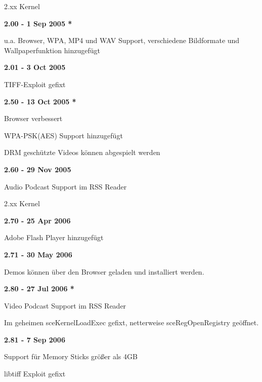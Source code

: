 \documentclass[mode=print,paper=screen,size=10pt,style=paintings]{powerdot}
\begin{document}
\begin{slide}{2.xx Kernel}
	\begin{large}\textbf{2.00 - 1 Sep 2005 *}\end{large}
	\begin{list}{-}{}
		\item{u.a. Browser, WPA, MP4 und WAV Support, verschiedene Bildformate und Wallpaperfunktion hinzugefügt}
	\end{list}
	\begin{large}\textbf{2.01 - 3 Oct 2005}\end{large}
	\begin{list}{-}{}
		\item{TIFF-Exploit gefixt}
	\end{list}
	\begin{large}\textbf{2.50 - 13 Oct 2005 *}\end{large}
	\begin{list}{-}{}
		\item{Browser verbessert}
		\item{WPA-PSK(AES) Support hinzugefügt}
		\item{DRM geschützte Videos können abgespielt werden}
	\end{list}
	\begin{large}\textbf{2.60 - 29 Nov 2005}\end{large}
	\begin{list}{-}{}
		\item{Audio Podcast Support im RSS Reader}
	\end{list}
\end{slide}

\begin{slide}{2.xx Kernel}
	\begin{large}\textbf{2.70 - 25 Apr 2006}\end{large}
	\begin{list}{-}{}
		\item{Adobe Flash Player hinzugefügt}
	\end{list}
	\begin{large}\textbf{2.71 - 30 May 2006}\end{large}
	\begin{list}{-}{}
		\item{Demos können über den Browser geladen und installiert werden.}
	\end{list}
	\begin{large}\textbf{2.80 - 27 Jul 2006 *}\end{large}
	\begin{list}{-}{}
		\item{Video Podcast Support im RSS Reader}
		\item{Im geheimen sceKernelLoadExec gefixt, netterweise sceRegOpenRegistry geöffnet.}
	\end{list}
	\begin{large}\textbf{2.81 - 7 Sep 2006}\end{large}
	\begin{list}{-}{}
		\item{Support für Memory Sticks größer als 4GB}
		\item{libtiff Exploit gefixt}
	\end{list}
\end{slide}
\end{document}
